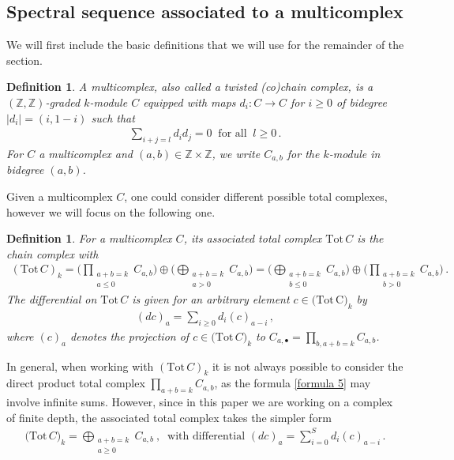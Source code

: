 \documentclass[10pt]{amsart}
\newcounter{dummy} \numberwithin{dummy}{section}
\newtheorem{definition}[dummy]{Definition}
\theoremstyle{remark}
\numberwithin{equation}{section}
\begin{document}
\subsection{Spectral sequence associated to a multicomplex}
We will first include the basic definitions that we will use for the remainder of the section.
\begin{definition}\label{def: multicomplex} A multicomplex, also called a twisted (co)chain complex, is a $(\mathbb Z,\mathbb Z)$-graded $k$-module $C$ equipped with maps $d_i\colon C\to C$ for $i\ge 0$ of bidegree $\vert d_i\vert=(i,1-i)$ such that
\begin{align}
    \sum_{i+j=l}d_id_j=0\ \text{ for all }\ l\ge 0\,.
\end{align}
    For $C$ a multicomplex and $(a,b)\in\mathbb Z\times\mathbb Z$, we write $C_{a,b}$ for the $k$-module in bidegree $(a,b)$.
\end{definition}
Given a multicomplex $C$, one could consider different possible total complexes, however we will focus on the following one.
\begin{definition}
    For a multicomplex $C$, its associated total complex $\mathrm{Tot}\,C$ is the chain complex with
    \begin{align*}
    \left(\mathrm{Tot}\,C\right)_k=\bigg(\prod_{\substack{a+b=k\\ a\le 0}}C_{a,b}\bigg)\oplus\bigg(\bigoplus_{\substack{a+b=k\\ a>0}}C_{a,b}\bigg)=\bigg(\bigoplus_{\substack{a+b=k\\ b\le 0}}C_{a,b}\bigg)\oplus\bigg(\prod_{\substack{a+b=k\\ b>0}}C_{a,b}\bigg)\,.
    \end{align*}
    The differential on $\mathrm{Tot}\,C$ is given for an arbitrary element $c\in\big( \mathrm{Tot\,C}\big)_k$ by
    \begin{align}\label{formula 5}
        (dc)_a=\sum_{i\ge 0}d_i(c)_{a-i}\,,
    \end{align}
    where $(c)_a$ denotes the projection of $c\in\big(\mathrm{Tot}\,C\big)_k$ to $C_{a,\bullet}=\prod_{b,a+b=k}C_{a,b}$.
\end{definition}
In general, when working with $(\mathrm{Tot}\,C)_k$ it is not always possible to consider the direct product total complex $\prod_{a+b=k}C_{a,b}$, as the formula \eqref{formula 5} may involve infinite sums. However, since in this paper we are working on a complex of finite depth, the associated total complex takes the simpler form
\begin{align}\label{formula 6}
    \big(\mathrm{Tot}\,C\big)_k=\bigoplus_{\substack{a+b=k\\ a\ge 0}}C_{a,b}\ , \ \text{ with differential }(dc)_a=\sum_{i=0}^Sd_i(c)_{a-i}\,.
\end{align}
\end{document}

